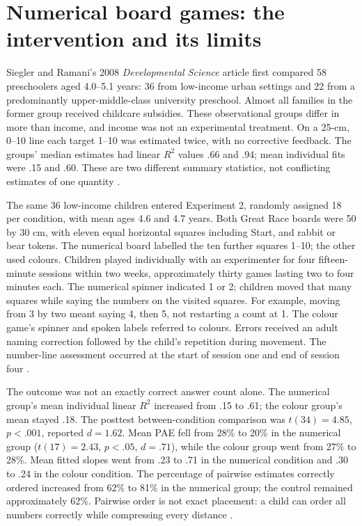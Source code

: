 \section{Numerical board games: the intervention and its limits}
\label{sec:p19-nl-board-games}

Siegler and Ramani's 2008 \emph{Developmental Science} article
first compared 58 preschoolers aged 4.0--5.1 years: 36 from
low-income urban settings and 22 from a predominantly
upper-middle-class university preschool. Almost all families in the
former group received childcare subsidies. These observational
groups differ in more than income, and income was not an
experimental treatment. On a 25-cm, 0--10 line each target 1--10
was estimated twice, with no corrective feedback. The groups'
median estimates had linear \(R^2\) values .66 and .94;
mean individual fits were .15 and .60. These are two different
summary statistics, not conflicting estimates of one quantity
\cite[pp.~657--658]{SieglerRamani2008BoardNL}.

The same 36 low-income children entered Experiment 2, randomly
assigned 18 per condition, with mean ages 4.6 and 4.7 years.
Both Great Race boards were 50 by 30 cm, with eleven equal
horizontal squares including Start, and rabbit or bear tokens.
The numerical board labelled the ten further squares 1--10;
the other used colours. Children played individually with an
experimenter for four fifteen-minute sessions within two weeks,
approximately thirty games lasting two to four minutes each.
The numerical spinner indicated 1 or 2; children moved that
many squares while saying the numbers on the visited squares.
For example, moving from 3 by two meant saying 4, then 5,
not restarting a count at 1. The colour game's spinner and spoken
labels referred to colours. Errors received an adult naming
correction followed by the child's repetition during movement.
The number-line assessment occurred at the start of session one
and end of session four \cite[p.~658]{SieglerRamani2008BoardNL}.

The outcome was not an exactly correct answer count alone.
The numerical group's mean individual linear \(R^2\) increased
from .15 to .61; the colour group's mean stayed .18.
The posttest between-condition comparison was
\(t(34)=4.85\), \(p<.001\), reported \(d=1.62\).
Mean PAE fell from 28\% to 20\% in the numerical group
(\(t(17)=2.43\), \(p<.05\), \(d=.71\)), while the colour
group went from 27\% to 28\%. Mean fitted slopes went from
.23 to .71 in the numerical condition and .30 to .24 in the
colour condition. The percentage of pairwise estimates correctly
ordered increased from 62\% to 81\% in the numerical group;
the control remained approximately 62\%. Pairwise order is not
exact placement: a child can order all numbers correctly while
compressing every distance \cite[pp.~658--659]
{SieglerRamani2008BoardNL}.

